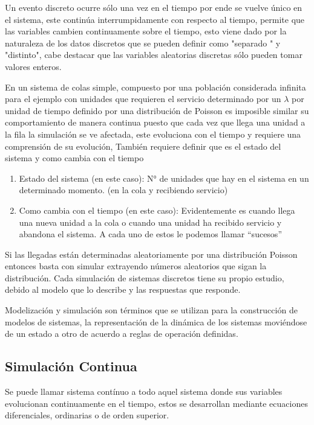 Un evento discreto ocurre sólo una vez en el tiempo por ende se vuelve único en el sistema, este continúa interrumpidamente con respecto al tiempo, permite que las variables cambien continuamente sobre el tiempo, esto viene dado por la naturaleza de los datos discretos que se pueden definir como "separado " y "distinto", cabe destacar que las variables aleatorias discretas sólo pueden tomar valores enteros.

En un sistema de colas simple, compuesto por una población considerada infinita para el ejemplo con unidades que requieren el servicio determinado por un $\lambda$ por unidad de tiempo definido por una distribución de Poisson es imposible similar su comportamiento de manera continua puesto que cada vez que llega una unidad a la fila la simulación se ve afectada, este evoluciona con el tiempo y requiere una comprensión de su evolución, También requiere definir que es el estado del sistema y como cambia con el tiempo 

\begin{enumerate}
    \item Estado del sistema (en este caso): N° de unidades que hay en el sistema en un determinado momento. (en la cola y recibiendo servicio)
    \item Como cambia con el tiempo (en este caso): Evidentemente es cuando llega una nueva unidad a la cola o cuando una unidad ha recibido servicio y abandona el sistema. A cada uno de estos le podemos llamar “sucesos”
\end{enumerate}

Si las llegadas están determinadas aleatoriamente por una distribución Poisson entonces basta con simular extrayendo números aleatorios que sigan la distribución. Cada simulación de sistemas discretos tiene su propio estudio, debido al modelo que lo describe y las respuestas que responde.

Modelización y simulación son términos que se utilizan para la construcción de modelos de sistemas, la representación de la dinámica de los sistemas moviéndose de un estado a otro de acuerdo a reglas de operación definidas.

\subsection{Simulación Continua} 
Se puede llamar sistema contínuo a todo aquel sistema donde sus variables evolucionan continuamente en el tiempo, estos se desarrollan mediante ecuaciones diferenciales, ordinarias o de orden superior.

